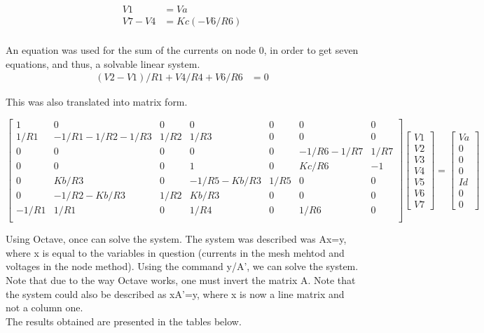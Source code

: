 \begin{align*} 
V1&=Va \\ V7-V4&=Kc(-V6/R6)\\
\end{align*}

An equation was used for the sum of the currents on node 0, in order to get seven equations, and thus, a solvable linear system.
\begin{align*} 
(V2-V1)/R1+V4/R4+V6/R6&=0
\end{align*}
 
This was also translated into matrix form.

$$
\begin{bmatrix} 
   1     & 0               & 0    & 0           & 0    & 0          & 0    \\
   1/R1  & -1/R1-1/R2-1/R3 & 1/R2 & 1/R3        & 0    & 0          & 0    \\
   0     & 0               & 0    & 0           & 0    & -1/R6-1/R7 & 1/R7 \\
   0     & 0               & 0    & 1           & 0    & Kc/R6      & -1   \\
   0     & Kb/R3           & 0    & -1/R5-Kb/R3 & 1/R5 & 0          & 0    \\
   0     & -1/R2-Kb/R3     & 1/R2 & Kb/R3       & 0    & 0          & 0    \\
   -1/R1 & 1/R1            & 0    & 1/R4        & 0    & 1/R6       & 0    \\
\end {bmatrix} 
\begin{bmatrix}
V1 \\ V2 \\ V3 \\ V4 \\ V5 \\ V6 \\ V7
\end{bmatrix}
=
\begin{bmatrix}
Va \\ 0 \\ 0 \\ 0 \\ Id \\ 0 \\ 0
\end{bmatrix}
$$

Using Octave, once can solve the system. The system was described was Ax=y, where x is equal to the variables in question (currents in the mesh mehtod and voltages in the node method). Using the command y/A', we can solve the system. Note that due to the way Octave works, one must invert the matrix A. Note that the system could also be described as xA'=y, where x is now a line matrix and not a column one.\\
The results obtained are presented in the tables below.

